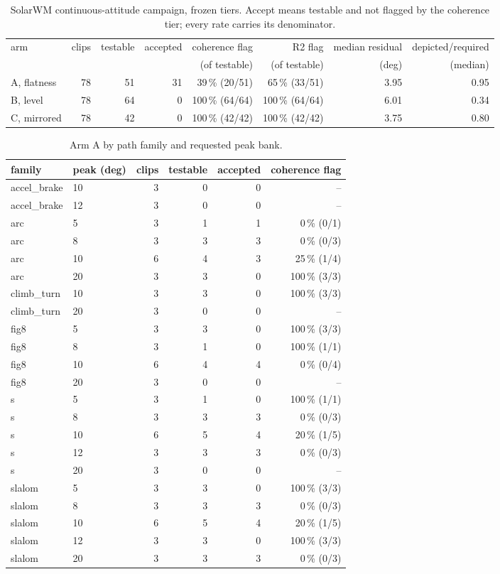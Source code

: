\begin{table}[t]
\footnotesize
\begin{tabular}{lrrrrrrr}
\toprule
arm & clips & testable & accepted & coherence flag & R2 flag & median residual & depicted/required \\
 & & & & (of testable) & (of testable) & (deg) & (median) \\
\midrule
A, flatness & 78 & 51 & 31 & 39\,\% (20/51) & 65\,\% (33/51) & 3.95 & 0.95 \\
B, level & 78 & 64 & 0 & 100\,\% (64/64) & 100\,\% (64/64) & 6.01 & 0.34 \\
C, mirrored & 78 & 42 & 0 & 100\,\% (42/42) & 100\,\% (42/42) & 3.75 & 0.80 \\
\bottomrule
\end{tabular}
\caption{SolarWM continuous-attitude campaign, frozen tiers.  Accept means testable and not flagged by the coherence tier; every rate carries its denominator.}
\label{tab:h04-arms}
\end{table}

\begin{table}[t]
\footnotesize
\begin{tabular}{llrrrr}
\toprule
family & peak (deg) & clips & testable & accepted & coherence flag \\
\midrule
accel_brake & 10 & 3 & 0 & 0 & -- \\
accel_brake & 12 & 3 & 0 & 0 & -- \\
arc & 5 & 3 & 1 & 1 & 0\,\% (0/1) \\
arc & 8 & 3 & 3 & 3 & 0\,\% (0/3) \\
arc & 10 & 6 & 4 & 3 & 25\,\% (1/4) \\
arc & 20 & 3 & 3 & 0 & 100\,\% (3/3) \\
climb_turn & 10 & 3 & 3 & 0 & 100\,\% (3/3) \\
climb_turn & 20 & 3 & 0 & 0 & -- \\
fig8 & 5 & 3 & 3 & 0 & 100\,\% (3/3) \\
fig8 & 8 & 3 & 1 & 0 & 100\,\% (1/1) \\
fig8 & 10 & 6 & 4 & 4 & 0\,\% (0/4) \\
fig8 & 20 & 3 & 0 & 0 & -- \\
s & 5 & 3 & 1 & 0 & 100\,\% (1/1) \\
s & 8 & 3 & 3 & 3 & 0\,\% (0/3) \\
s & 10 & 6 & 5 & 4 & 20\,\% (1/5) \\
s & 12 & 3 & 3 & 3 & 0\,\% (0/3) \\
s & 20 & 3 & 0 & 0 & -- \\
slalom & 5 & 3 & 3 & 0 & 100\,\% (3/3) \\
slalom & 8 & 3 & 3 & 3 & 0\,\% (0/3) \\
slalom & 10 & 6 & 5 & 4 & 20\,\% (1/5) \\
slalom & 12 & 3 & 3 & 0 & 100\,\% (3/3) \\
slalom & 20 & 3 & 3 & 3 & 0\,\% (0/3) \\
\bottomrule
\end{tabular}
\caption{Arm A by path family and requested peak bank.}
\label{tab:h04-grid}
\end{table}

